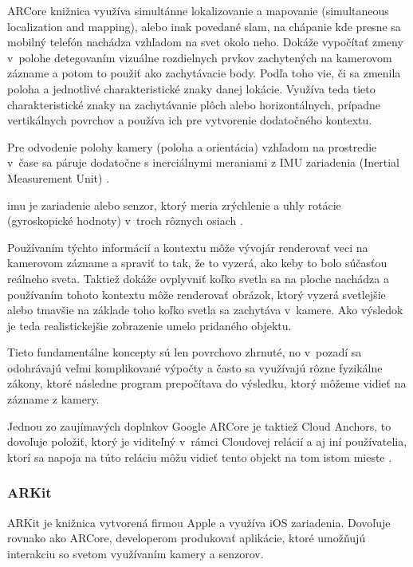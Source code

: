 ARCore knižnica využíva  simultánne lokalizovanie a mapovanie (simultaneous localization and mapping), alebo inak povedané \gls{slam}, na chápanie kde presne sa mobilný telefón nachádza vzhľadom na svet okolo neho. Dokáže vypočítať zmeny v~polohe detegovaním vizuálne rozdielnych prvkov zachytených na kamerovom zázname a potom to použiť ako zachytávacie body. Podľa toho vie, či sa zmenila poloha a jednotlivé charakteristické znaky danej lokácie. Využíva teda tieto charakteristické znaky na zachytávanie plôch alebo horizontálnych, prípadne vertikálnych povrchov a používa ich pre vytvorenie dodatočného kontextu. 

Pre odvodenie polohy kamery (poloha a orientácia) vzhľadom na prostredie v~čase sa páruje dodatočne s inerciálnymi meraniami z IMU zariadenia (Inertial Measurement Unit) \cite{conway2023arcore}. 

\gls{imu} je zariadenie alebo senzor, ktorý meria zrýchlenie a uhly rotácie (gyroskopické hodnoty) v~troch rôznych osiach \cite{vectornav2024imu}.

Používaním týchto informácií a kontextu môže vývojár renderovať veci na kamerovom zázname a spraviť to tak, že to vyzerá, ako keby to bolo súčasťou reálneho sveta. Taktiež dokáže ovplyvniť koľko svetla sa na ploche nachádza a používaním tohoto kontextu môže renderovať obrázok, ktorý vyzerá svetlejšie alebo tmavšie na základe toho koľko svetla sa zachytáva v~kamere. Ako výsledok je teda realistickejšie zobrazenie umelo pridaného objektu.

Tieto fundamentálne koncepty sú len povrchovo zhrnuté, no v~pozadí sa odohrávajú veľmi komplikované výpočty a často sa využívajú rôzne fyzikálne zákony, ktoré následne program prepočítava do výsledku, ktorý môžeme vidieť na zázname z kamery. %

Jednou zo zaujímavých doplnkov Google ARCore je taktiež Cloud Anchors, to dovoľuje položiť, ktorý je viditeľný v~rámci Cloudovej relácií a aj iní používatelia, ktorí sa napoja na túto reláciu môžu vidieť tento objekt na tom istom mieste \cite{conway2023arcore}. 

\subsubsection{ARKit}

ARKit je knižnica vytvorená firmou Apple a využíva iOS zariadenia. Dovoľuje rovnako ako ARCore, developerom produkovať aplikácie, ktoré umožňujú interakciu so svetom využívaním kamery a senzorov. 

